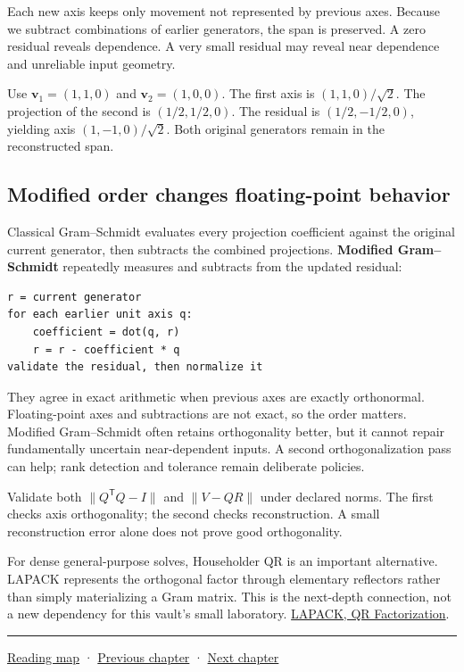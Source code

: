 Each new axis keeps only movement not represented by previous axes. Because we subtract combinations of earlier generators, the span is preserved. A zero residual reveals dependence. A very small residual may reveal near dependence and unreliable input geometry.

Use \(\mathbf v_1=(1,1,0)\) and \(\mathbf v_2=(1,0,0)\). The first axis is \((1,1,0)/\sqrt2\). The projection of the second is \((1/2,1/2,0)\). The residual is \((1/2,-1/2,0)\), yielding axis \((1,-1,0)/\sqrt2\). Both original generators remain in the reconstructed span.

\subsection{Modified order changes floating-point behavior}\label{01-foundations-i-ch017-modified-order-changes-floating-point-behavior}

Classical Gram--Schmidt evaluates every projection coefficient against the original current generator, then subtracts the combined projections. \textbf{Modified Gram--Schmidt} repeatedly measures and subtracts from the updated residual:

\begin{verbatim}
r = current generator
for each earlier unit axis q:
    coefficient = dot(q, r)
    r = r - coefficient * q
validate the residual, then normalize it
\end{verbatim}

They agree in exact arithmetic when previous axes are exactly orthonormal. Floating-point axes and subtractions are not exact, so the order matters. Modified Gram--Schmidt often retains orthogonality better, but it cannot repair fundamentally uncertain near-dependent inputs. A second orthogonalization pass can help; rank detection and tolerance remain deliberate policies.

Validate both \(\|Q^\mathsf TQ-I\|\) and \(\|V-QR\|\) under declared norms. The first checks axis orthogonality; the second checks reconstruction. A small reconstruction error alone does not prove good orthogonality.

For dense general-purpose solves, Householder QR is an important alternative. LAPACK represents the orthogonal factor through elementary reflectors rather than simply materializing a Gram matrix. This is the next-depth connection, not a new dependency for this vault's small laboratory. \href{https://www.netlib.org/lapack/lug/node40.html}{LAPACK, QR Factorization}.

\begin{center}\rule{0.5\linewidth}{0.5pt}\end{center}

\hyperref[volume-reading-map]{Reading map} · \hyperref[01-foundations-i-ch016-profile-gpus-and-respect-apple-ownership-boundaries]{Previous chapter} · \hyperref[01-foundations-i-ch018-vectors-for-light-and-frames]{Next chapter}
